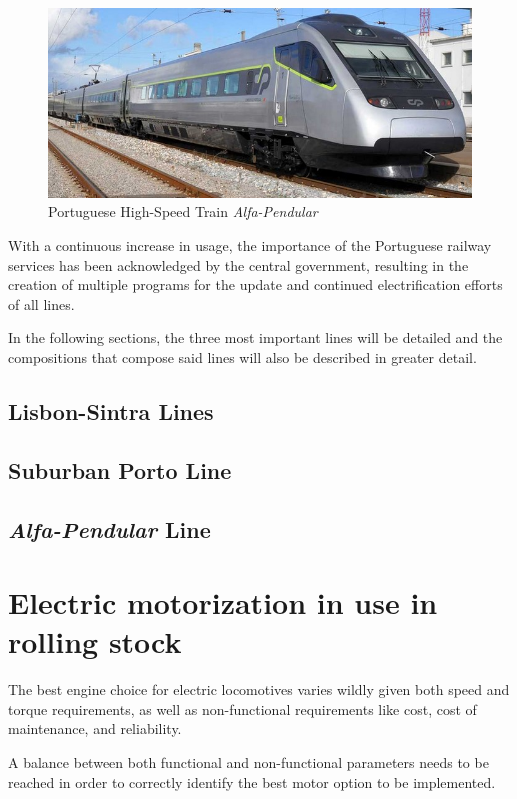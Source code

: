 \begin{figure}[h]
    \centering
    \includegraphics[scale =0.5]{Figures/Alfa.jpg}
    \caption{Portuguese High-Speed Train \textit{Alfa-Pendular}}
    \label{fig:Alfa}
\end{figure}

With a continuous increase in usage, the importance of the Portuguese railway services has been acknowledged by the central government, resulting in the creation of multiple programs for the update and continued electrification efforts of all lines.

In the following sections, the three most important lines will be detailed and the compositions that compose said lines will also be described in greater detail.

\subsection{Lisbon-Sintra Lines}
\subsection{Suburban Porto Line}
\subsection{\textit{Alfa-Pendular} Line}

\section{Electric motorization in use in rolling stock}\label{sec:sota_motor}
The best engine choice for electric locomotives varies wildly given both speed and torque requirements, as well as non-functional requirements like cost, cost of maintenance, and reliability.

A balance between both functional and non-functional parameters needs to be reached in order to correctly identify the best motor option to be implemented. 

